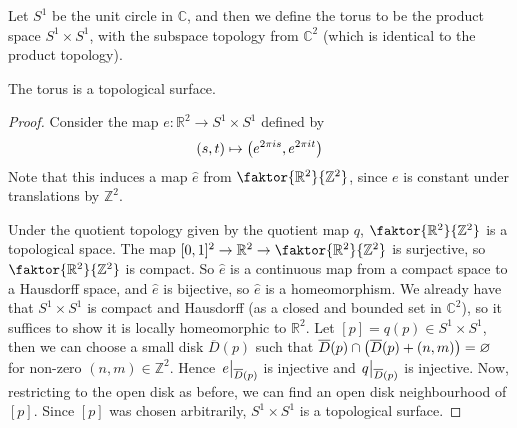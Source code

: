 \begin{example}
	Let \( S^1 \) be the unit circle in \( \mathbb C \), and then we define the torus to be the product space \( S^1 \times S^1 \), with the subspace topology from \( \mathbb C^2 \) (which is identical to the product topology).
	\begin{lemma}
		The torus is a topological surface.
	\end{lemma}
	\begin{proof}
		Consider the map \( e \colon \mathbb R^2 \to S^1 \times S^1 \) defined by
		\[ (s,t) \mapsto \qty(e^{2\pi i s}, e^{2 \pi i t}) \]
		Note that this induces a map \( \hat e \) from \( \faktor{\mathbb R^2}{\mathbb Z^2} \), since \( e \) is constant under translations by \( \mathbb Z^2 \).

		\begin{center}
		\end{center}

		Under the quotient topology given by the quotient map \( q \), \( \faktor{\mathbb R^2}{\mathbb Z^2} \) is a topological space.
		The map \( [0,1]^2 \to \mathbb R^2 \to \faktor{\mathbb R^2}{\mathbb Z^2} \) is surjective, so \( \faktor{\mathbb R^2}{\mathbb Z^2} \) is compact.
		So \( \hat e \) is a continuous map from a compact space to a Hausdorff space, and \( \hat e \) is bijective, so \( \hat e \) is a homeomorphism.
		We already have that \( S^1 \times S^1 \) is compact and Hausdorff (as a closed and bounded set in \( \mathbb C^2 \)), so it suffices to show it is locally homeomorphic to \( \mathbb R^2 \).
		Let \( [p] = q(p) \in S^1 \times S^1 \), then we can choose a small disk \( \overline D(p) \) such that \( \overline D(p) \cap \qty(\overline D(p) + (n,m)) = \varnothing \) for non-zero \( (n,m) \in \mathbb Z^2 \).
		Hence \( \eval{e}_{\overline D(p)} \) is injective and \( \eval{q}_{\overline D(p)} \) is injective.
		Now, restricting to the open disk as before, we can find an open disk neighbourhood of \( [p] \).
		Since \( [p] \) was chosen arbitrarily, \( S^1 \times S^1 \) is a topological surface.
	\end{proof}
\end{example}
